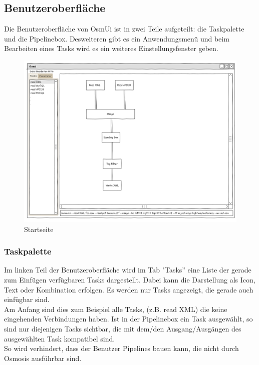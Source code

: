 \documentclass[a4paper,12pt]{scrartcl}
\begin{document}
\subsection{Benutzeroberfläche}
Die Benutzeroberfläche von OsmUi ist in zwei Teile aufgeteilt: die Taskpalette und die Pipelinebox. Desweiteren gibt es ein Anwendungsmenü und beim Bearbeiten eines Tasks
wird es ein weiteres Einstellungsfenster geben.\\
\begin{center}
\begin{figure}[h!]
\begin{center}
\includegraphics[width=15cm]{ui_prototype/OsmUi_Startseite.png}
\caption{Startseite}
\end{center}
\end{figure}
\end{center}
\subsubsection{Taskpalette}
Im linken Teil der Benutzeroberfläche wird im Tab "Tasks'' eine Liste der gerade zum Einfügen verfügbaren Tasks dargestellt. Dabei kann die Darstellung als Icon,
Text oder Kombination erfolgen. Es werden nur Tasks angezeigt, die gerade auch einfügbar sind. \\
Am Anfang sind dies zum Beispiel alle Tasks, (z.B. read XML) die keine eingehenden Verbindungen haben. Ist in der Pipelinebox ein Task ausgewählt, so
sind nur diejenigen Tasks sichtbar, die mit dem/den Ausgang/Ausgängen des ausgewählten Task kompatibel sind.\\
So wird verhindert, dass der Benutzer Pipelines bauen kann, die nicht durch Osmosis ausführbar sind.
\end{document}
